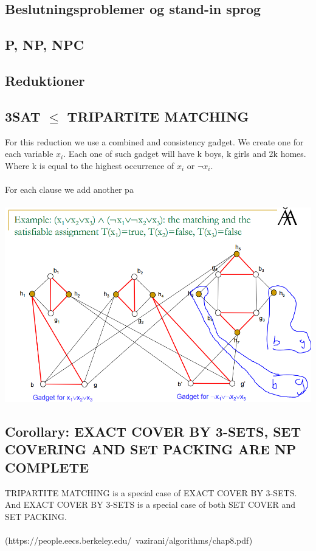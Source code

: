 \subsection{Beslutningsproblemer og stand-in sprog}
\subsection{P, NP, NPC}
\subsection{Reduktioner}
\subsection{3SAT $\le$ TRIPARTITE MATCHING}
For this reduction we use a combined  and consistency gadget. We create one for each variable $x_i$. Each one of such gadget will have k boys, k girls and 2k homes. Where k is equal to the highest occurrence of $x_i$ or $\lnot x_i$.\\\\

For each clause we add another pa\\\\
\includegraphics[scale=0.5]{tripartite}
\newpage
\newpage
\subsection{Corollary: EXACT COVER BY 3-SETS, SET COVERING AND SET PACKING ARE NP COMPLETE}
TRIPARTITE MATCHING is a special case of EXACT COVER BY 3-SETS. And EXACT COVER BY 3-SETS is a special case of both SET COVER and SET PACKING.\\\\ (https://people.eecs.berkeley.edu/~vazirani/algorithms/chap8.pdf)
